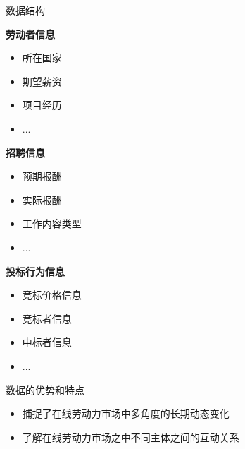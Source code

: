 \documentclass{beamer}
\newcommand{\boldcolor}[1]{\textbf{\textcolor{custompurple}{#1}}}
\begin{document}
    \begin{frame}{数据结构}{\secname}
    \begin{minipage}[t]{0.3\textwidth} %
        \boldcolor{劳动者信息}
            \begin{itemize}
                \item 所在国家
                \item 期望薪资
                \item 项目经历
                \item ...
            \end{itemize}
    \end{minipage}%
    \hfill %
    \begin{minipage}[t]{0.3\textwidth} %
    \boldcolor{招聘信息}
            \begin{itemize}
                \item 预期报酬
                \item 实际报酬
                \item 工作内容类型
                \item ...
            \end{itemize}
    \end{minipage}%
    \hfill %
    \begin{minipage}[t]{0.3\textwidth} %
    \boldcolor{投标行为信息}
            \begin{itemize}
                \item 竞标价格信息
                \item 竞标者信息
                \item 中标者信息
                \item ...
            \end{itemize}
    \end{minipage}
    \pause
    \begin{block}{数据的优势和特点}
        \begin{itemize}
            \item 捕捉了在线劳动力市场中多角度的长期动态变化
            \item 了解在线劳动力市场之中不同主体之间的互动关系
        \end{itemize}
    \end{block}
    \end{frame}
\end{document}
